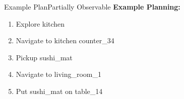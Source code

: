 \begin{Example}{Example Plan}{Partially Observable}
      \textbf{Example Planning:}
      \begin{enumerate}
            \item Explore kitchen
            \item Navigate to kitchen counter\_34
            \item Pickup sushi\_mat
            \item Navigate to living\_room\_1
            \item Put sushi\_mat on table\_14
      \end{enumerate}
\end{Example}\label{ex:example_plan}